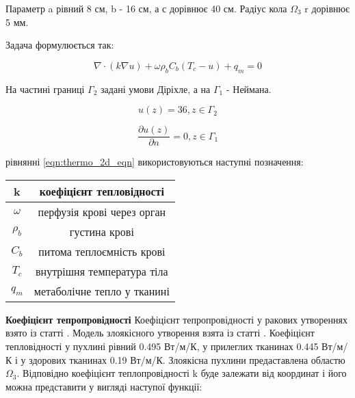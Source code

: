\noindent Параметр a рівний 8 см, b - 16 см, а с дорівнює 40 см. Радіус кола $\Omega_3$ r дорівнює 5 мм.

\noindent Задача формулюється так:

\begin{equation}
    \label{eqn:thermo_2d_eqn}
    \nabla \cdot (k \nabla u) + \omega \rho_b C_b (T_c - u) + q_m  = 0
\end{equation}

\noindent На частині границі $\Gamma_2$ задані умови Діріхле, а на $\Gamma_1$ - Неймана.

\begin{equation}
    \label{eqn:thermo_2d_cond_1}
    u(z) = 36, z \in \Gamma_2
\end{equation}

\begin{equation}
    \label{eqn:thermo_2d_cond_2}
    \dfrac{\partial{u(z)}}{\partial{n}} = 0, z \in \Gamma_1
\end{equation}

 рівнянні \ref{eqn:thermo_2d_eqn} використовуються наступні позначення:

\begin{center}
    \begin{tabular}{|c|c|} 
        \hline
            k & коефіцієнт тепловідності \\
        \hline
            \(\omega\) & перфузія крові через орган \\
        \hline
            \(\rho_b\) & густина крові \\
        \hline
            \(C_b\) & питома теплоємність крові \\
        \hline
            \(T_c\) & внутрішня температура тіла \\
        \hline
            \(q_m\) & метаболічне тепло у тканині \\
        \hline
    \end{tabular}
\end{center}

\textbf{Коефіцієнт тепропровідності} Коефіцієнт тепропровідності у ракових утвореннях взято із статті 
\cite{lung-tumor-thermal-conductivity}. Модель злоякісного утворення взята із статті \cite{tumor-thermal-model}.
Коефіцієнт тепловідності у пухлині рівний 0.495 Вт/м/К, у прилеглих тканинах 0.445 Вт/м/К і у здорових тканинах 
0.19 Вт/м/К. Злоякісна пухлини предаставлена областю $\Omega_3$. Відповідно коефіцієнт теплопровідності k буде залежати
від координат і його можна представити у вигляді наступої функції:

